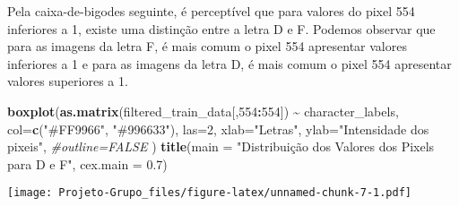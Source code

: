 \documentclass[
]{article}
\newenvironment{Shaded}{\begin{snugshade}}{\end{snugshade}}
\newcommand{\AttributeTok}[1]{\textcolor[rgb]{0.13,0.29,0.53}{#1}}
\newcommand{\CommentTok}[1]{\textcolor[rgb]{0.56,0.35,0.01}{\textit{#1}}}
\newcommand{\DecValTok}[1]{\textcolor[rgb]{0.00,0.00,0.81}{#1}}
\newcommand{\FloatTok}[1]{\textcolor[rgb]{0.00,0.00,0.81}{#1}}
\newcommand{\FunctionTok}[1]{\textcolor[rgb]{0.13,0.29,0.53}{\textbf{#1}}}
\newcommand{\NormalTok}[1]{#1}
\newcommand{\SpecialCharTok}[1]{\textcolor[rgb]{0.81,0.36,0.00}{\textbf{#1}}}
\newcommand{\StringTok}[1]{\textcolor[rgb]{0.31,0.60,0.02}{#1}}
\begin{document}
Pela caixa-de-bigodes seguinte, é perceptível que para valores do pixel
554 inferiores a 1, existe uma distinção entre a letra D e F. Podemos
observar que para as imagens da letra F, é mais comum o pixel 554
apresentar valores inferiores a 1 e para as imagens da letra D, é mais
comum o pixel 554 apresentar valores superiores a 1.

\begin{Shaded}
\begin{Highlighting}[]
\FunctionTok{boxplot}\NormalTok{(}\FunctionTok{as.matrix}\NormalTok{(filtered\_train\_data[,}\DecValTok{554}\SpecialCharTok{:}\DecValTok{554}\NormalTok{]) }\SpecialCharTok{\textasciitilde{}}\NormalTok{ character\_labels,}
        \AttributeTok{col=}\FunctionTok{c}\NormalTok{(}\StringTok{"\#FF9966"}\NormalTok{, }\StringTok{"\#996633"}\NormalTok{), }
        \AttributeTok{las=}\DecValTok{2}\NormalTok{,}
        \AttributeTok{xlab=}\StringTok{"Letras"}\NormalTok{,}
        \AttributeTok{ylab=}\StringTok{"Intensidade dos pixeis"}\NormalTok{,}
        \CommentTok{\#outline=FALSE}
\NormalTok{)}
\FunctionTok{title}\NormalTok{(}\AttributeTok{main =} \StringTok{"Distribuição dos Valores dos Pixels para \textquotesingle{}D\textquotesingle{} e \textquotesingle{}F\textquotesingle{}"}\NormalTok{, }\AttributeTok{cex.main =} \FloatTok{0.7}\NormalTok{)}
\end{Highlighting}
\end{Shaded}

\texttt{[image: Projeto-Grupo\_files/figure-latex/unnamed-chunk-7-1.pdf]}
\end{document}
